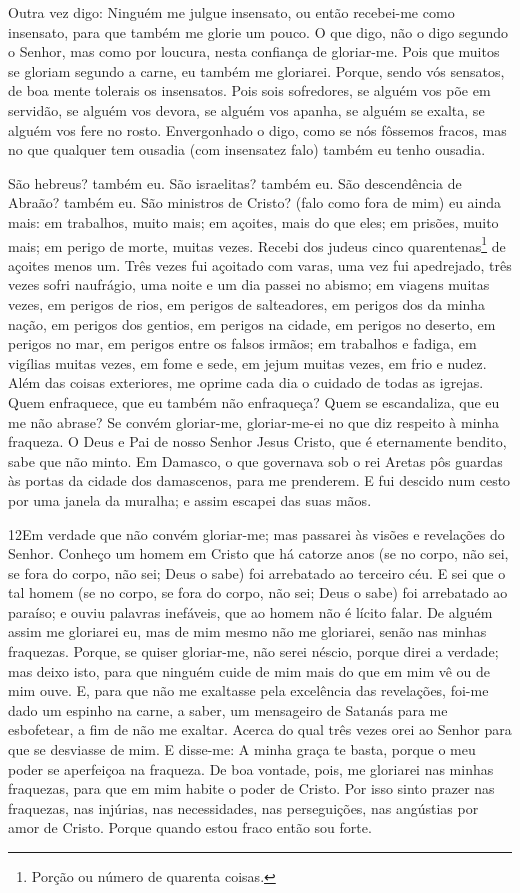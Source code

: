 Outra vez digo: Ninguém me julgue insensato, ou então recebei-me
como insensato, para que também me glorie um pouco. O que
digo, não o digo segundo o Senhor, mas como por loucura, nesta
confiança de gloriar-me. Pois que muitos se gloriam segundo a
carne, eu também me gloriarei. Porque, sendo vós sensatos, de
boa mente tolerais os insensatos. Pois sois sofredores, se
alguém vos põe em servidão, se alguém vos devora, se alguém vos
apanha, se alguém se exalta, se alguém vos fere no rosto.
Envergonhado o digo, como se nós fôssemos fracos, mas no que
qualquer tem ousadia (com insensatez falo) também eu tenho ousadia.

São hebreus? também eu. São israelitas? também eu. São
descendência de Abraão? também eu. São ministros de Cristo?
(falo como fora de mim) eu ainda mais: em trabalhos, muito mais; em
açoites, mais do que eles; em prisões, muito mais; em perigo de
morte, muitas vezes. Recebi dos judeus cinco
quarentenas\footnote{Porção ou número de quarenta coisas.} de
açoites menos um. Três vezes fui açoitado com varas, uma vez
fui apedrejado, três vezes sofri naufrágio, uma noite e um dia
passei no abismo; em viagens muitas vezes, em perigos de
rios, em perigos de salteadores, em perigos dos da minha nação, em
perigos dos gentios, em perigos na cidade, em perigos no deserto, em
perigos no mar, em perigos entre os falsos irmãos; em
trabalhos e fadiga, em vigílias muitas vezes, em fome e sede, em
jejum muitas vezes, em frio e nudez. Além das coisas
exteriores, me oprime cada dia o cuidado de todas as igrejas.
Quem enfraquece, que eu também não enfraqueça? Quem se
escandaliza, que eu me não abrase? Se convém gloriar-me,
gloriar-me-ei no que diz respeito à minha fraqueza. O Deus e
Pai de nosso Senhor Jesus Cristo, que é eternamente bendito, sabe
que não minto. Em Damasco, o que governava sob o rei Aretas
pôs guardas às portas da cidade dos damascenos, para me prenderem.
E fui descido num cesto por uma janela da muralha; e assim
escapei das suas mãos.

\medskip

\lettrine{12} Em verdade que não convém gloriar-me; mas
passarei às visões e revelações do Senhor. Conheço um homem em
Cristo que há catorze anos (se no corpo, não sei, se fora do corpo,
não sei; Deus o sabe) foi arrebatado ao terceiro céu. E sei que
o tal homem (se no corpo, se fora do corpo, não sei; Deus o sabe)
foi arrebatado ao paraíso; e ouviu palavras inefáveis, que ao
homem não é lícito falar. De alguém assim me gloriarei eu, mas
de mim mesmo não me gloriarei, senão nas minhas fraquezas.
Porque, se quiser gloriar-me, não serei néscio, porque direi a
verdade; mas deixo isto, para que ninguém cuide de mim mais do que
em mim vê ou de mim ouve. E, para que não me exaltasse pela
excelência das revelações, foi-me dado um espinho na carne, a saber,
um mensageiro de Satanás para me esbofetear, a fim de não me
exaltar. Acerca do qual três vezes orei ao Senhor para que se
desviasse de mim. E disse-me: A minha graça te basta, porque o
meu poder se aperfeiçoa na fraqueza. De boa vontade, pois, me
gloriarei nas minhas fraquezas, para que em mim habite o poder de
Cristo. Por isso sinto prazer nas fraquezas, nas injúrias,
nas necessidades, nas perseguições, nas angústias por amor de
Cristo. Porque quando estou fraco então sou forte.

